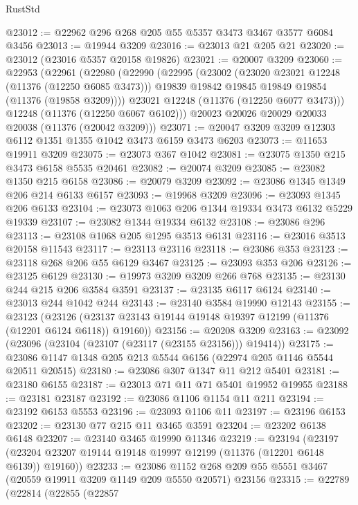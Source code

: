 \begin{lexlean}{RustStd}
\begin{coremodule}
{\begin{coremodule}
{{{{{{{{{{{{{{{{{{{{{{{{{{{{{{{{{{{{{{{{{{{{{{{{{{{{{{{{{{{{{{{{{{{{{{{{{{{{{{{{{{{{{@23012 := @22962 @296 @268 @205 @55 @5357 @3473 @3467 @3577 @6084 @3456
@23013 := @19944 @3209
@23016 := @23013 @21 @205 @21
@23020 := @23012 (@23016 @5357 @20158 @19826)
@23021 := @20007 @3209
@23060 := @22953
    (@22961
      (@22980
        (@22990
          (@22995
            (@23002
              (@23020 @23021 @12248 (@11376 (@12250 @6085 @3473)))
              @19839
              @19842
              @19845
              @19849
              @19854
              (@11376 (@19858 @3209))))
          @23021
          @12248
          (@11376 (@12250 @6077 @3473)))
        @12248
        (@11376 (@12250 @6067 @6102)))
      @20023
      @20026
      @20029
      @20033
      @20038
      (@11376 (@20042 @3209)))
@23071 := @20047 @3209 @3209 @12303 @6112 @1351 @1355 @1042 @3473 @6159 @3473 @6203
@23073 := @11653 @19911 @3209
@23075 := @23073 @367 @1042
@23081 := @23075 @1350 @215 @3473 @6158 @5535 @20461
@23082 := @20074 @3209
@23085 := @23082 @1350 @215 @6158
@23086 := @20079 @3209
@23092 := @23086 @1345 @1349 @206 @214 @6133 @6157
@23093 := @19968 @3209
@23096 := @23093 @1345 @206 @6133
@23104 := @23073 @1063 @206 @1344 @19334 @3473 @6132 @5229 @19339
@23107 := @23082 @1344 @19334 @6132
@23108 := @23086 @296
@23113 := @23108 @1068 @205 @1295 @3513 @6131
@23116 := @23016 @3513 @20158 @11543
@23117 := @23113 @23116
@23118 := @23086 @353
@23123 := @23118 @268 @206 @55 @6129 @3467
@23125 := @23093 @353 @206
@23126 := @23125 @6129
@23130 := @19973 @3209 @3209 @266 @768
@23135 := @23130 @244 @215 @206 @3584 @3591
@23137 := @23135 @6117 @6124
@23140 := @23013 @244 @1042 @244
@23143 := @23140 @3584 @19990 @12143
@23155 := @23123
    (@23126 (@23137 @23143 @19144 @19148 @19397 @12199 (@11376 (@12201 @6124 @6118)) @19160))
@23156 := @20208 @3209
@23163 := @23092 (@23096 (@23104 (@23107 (@23117 (@23155 @23156))) @19414))
@23175 := @23086 @1147 @1348 @205 @213 @5544 @6156 (@22974 @205 @1146 @5544 @20511 @20515)
@23180 := @23086 @307 @1347 @11 @212 @5401
@23181 := @23180 @6155
@23187 := @23013 @71 @11 @71 @5401 @19952 @19955
@23188 := @23181 @23187
@23192 := @23086 @1106 @1154 @11 @211
@23194 := @23192 @6153 @5553
@23196 := @23093 @1106 @11
@23197 := @23196 @6153
@23202 := @23130 @77 @215 @11 @3465 @3591
@23204 := @23202 @6138 @6148
@23207 := @23140 @3465 @19990 @11346
@23219 := @23194
    (@23197 (@23204 @23207 @19144 @19148 @19997 @12199 (@11376 (@12201 @6148 @6139)) @19160))
@23233 := @23086
    @1152
    @268
    @209
    @55
    @5551
    @3467
    (@20559 @19911 @3209 @1149 @209 @5550 @20571)
    @23156
@23315 := @22789
    (@22814
      (@22855
        (@22857
}}}}}}}}}}}}}}}}}}}}}}}}}}}}}}}}}}}}}}}}}}}}}}}}}}}}}}}}}}}}}}}}}}}}}}}}}}}}}}}}}}}}}
\end{coremodule}}
\end{coremodule}
\end{lexlean}
